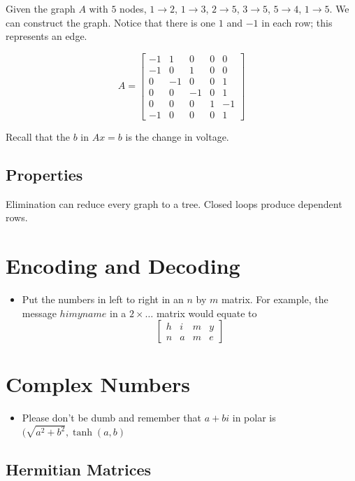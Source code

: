 \documentclass{article}
\begin{document}
Given the graph $A$ with $5$ nodes, $1 \rightarrow 2$, $1 \rightarrow 3$, $2 \rightarrow 5$, $3 \rightarrow 5$, $5 \rightarrow 4$, $1 \rightarrow 5$. We can construct the graph. Notice that there is one $1$ and $-1$ in each row; this represents an edge.

$$
A = \begin{bmatrix}
	-1 & 1 & 0 & 0 & 0 \\
	-1 & 0 & 1 & 0 & 0 \\
	0 & -1 & 0 & 0 & 1 \\
	0 & 0 & -1 & 0 & 1 \\
	0 & 0 & 0 & 1 & -1 \\
	-1 & 0 & 0 & 0 & 1
\end{bmatrix}
$$

Recall that the $b$ in $Ax=b$ is the change in voltage.

\subsection{Properties}

Elimination can reduce every graph to a tree. Closed loops produce dependent rows.

\section{Encoding and Decoding}

\begin{itemize}
	\item Put the numbers in left to right in an $n$ by $m$ matrix. For example, the message $himyname$ in a $2 \times \ldots$ matrix would equate to
	$$
	\begin{bmatrix}
		h & i & m & y \\ n & a & m & e
	\end{bmatrix}
	$$
\end{itemize}

\section{Complex Numbers}

\begin{itemize}
	\item Please don't be dumb and remember that $a + bi$ in polar is $(\sqrt{a^2+b^2}, \tanh(a, b)$
\end{itemize}

\subsection{Hermitian Matrices}
\end{document}
